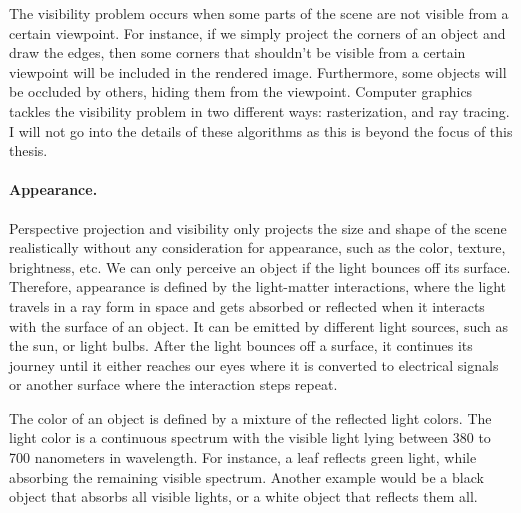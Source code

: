 The visibility problem occurs when some parts of the scene are not visible from a certain viewpoint. For instance, if we simply project the corners of an object and draw the edges, then some corners that shouldn't be visible from  a certain viewpoint will be included in the rendered image. Furthermore, some objects will be occluded by others, hiding them from the viewpoint. Computer graphics tackles the visibility problem in two different ways: rasterization, and ray tracing. I will not go into the details of these algorithms as this is beyond the focus of this thesis.


\paragraph{Appearance.}
Perspective projection and visibility only projects the size and shape of the scene realistically without any consideration for appearance, such as the color, texture, brightness, etc. We can only perceive an object if the light bounces off its surface. Therefore, appearance is defined by the light-matter interactions, where the light travels in a ray form in space and gets absorbed or reflected when it interacts with the surface of an object. It can be emitted by different light sources, such as the sun, or light bulbs. After the light bounces off a surface, it continues its journey until it either reaches our eyes where it is converted to electrical signals or another surface where the interaction steps repeat.

The color of an object is defined by a mixture of the reflected light colors. The light color is a continuous spectrum with the visible light lying between 380 to 700 nanometers in wavelength. For instance, a leaf reflects green light, while absorbing the remaining visible spectrum. Another example would be a black object that absorbs all visible lights, or a white object that reflects them all.

